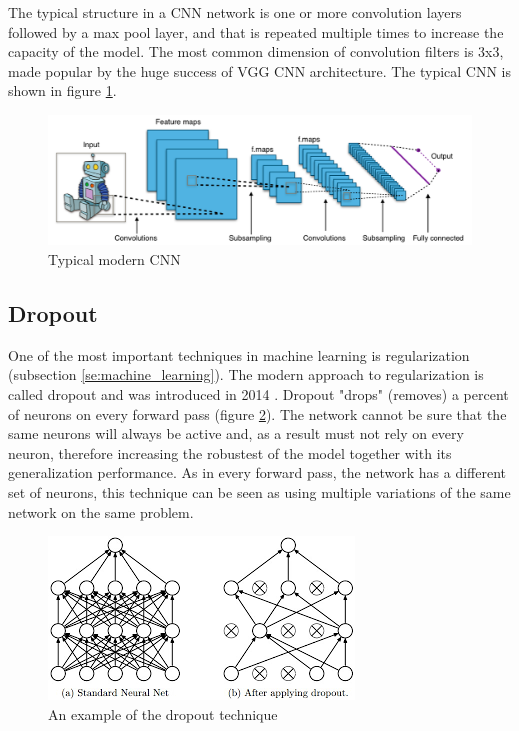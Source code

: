 \documentclass[times, utf8, diplomski]{fer}
\begin{document}
The typical structure in a CNN network is one or more convolution layers followed by a max pool layer, and that is repeated multiple times to increase the capacity of the model. The most common dimension of convolution filters is 3x3, made popular by the huge success of VGG \citep{simonyan_very_2014} CNN architecture. The typical CNN is shown in figure \ref{fig:cnn}.

\begin{figure}
  \includegraphics[scale=0.43]{figures/cnn.png}
  \centering
  \caption{Typical modern CNN}
  \label{fig:cnn}
\end{figure}

\subsection{Dropout} \label{se:dropout}

One of the most important techniques in machine learning is regularization (subsection \ref{se:machine_learning}). The modern approach to regularization is called dropout and was introduced in 2014 \citep{srivastava_dropout:_2014}. Dropout "drops" (removes) a percent of neurons on every forward pass (figure \ref{fig:dropout}). The network cannot be sure that the same neurons will always be active and, as a result must not rely on every neuron, therefore increasing the robustest of the model together with its generalization performance. As in every forward pass, the network has a different set of neurons, this technique can be seen as using multiple variations of the same network on the same problem.

\begin{figure}
  \includegraphics[scale=0.91]{figures/dropout.png}
  \centering
  \caption{An example of the dropout technique}
  \label{fig:dropout}
\end{figure}
\end{document}

